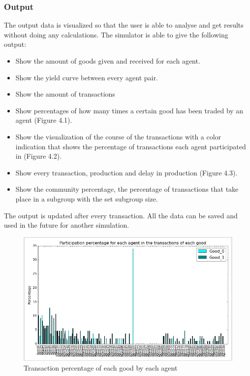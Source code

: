 \documentclass[twoside,openright]{uva-bachelor-thesis}
\begin{document}
\subsubsection{Output}
The output data is visualized so that the user is able to analyse and get results without doing any calculations. The simulator is able to give the following output:
\begin{itemize}
  \item Show the amount of goods given and received for each agent.
  \item Show the yield curve between every agent pair.
  \item Show the amount of transactions
  \item Show percentages of how many times a certain good has been traded by an agent (Figure 4.1).
  \item Show the visualization of the course of the transactions with a color indication that shows the percentage of transactions each agent participated in (Figure 4.2). 
  \item Show every transaction, production and delay in production (Figure 4.3).
  \item Show the community percentage, the percentage of transactions that take place in a subgroup with the set subgroup size.
\end{itemize}

The output is updated after every transaction. All the data can be saved and used in the future for another simulation.

\begin{figure}
  \centering
  \includegraphics[scale=0.4]{Simulation2_figures/Distribution}
  \caption{Transaction percentage of each good by each agent}
\end{figure}
\end{document}
